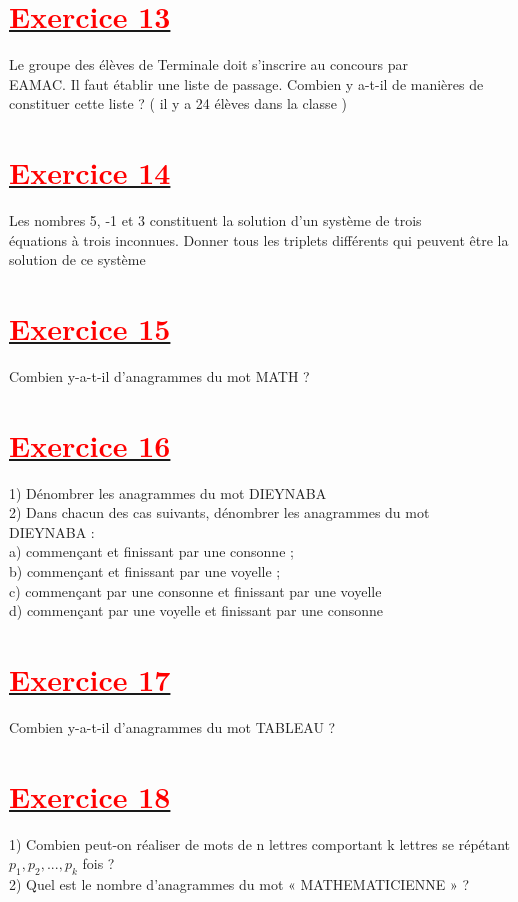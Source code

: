 \documentclass[12pt,a4paper]{article}
\begin{document}
\section*{\underline{\textbf{\textcolor{red}{Exercice 13}}}}
Le groupe des élèves de Terminale doit s'inscrire au concours par\\ EAMAC. Il faut établir une liste de passage. Combien y a-t-il de manières de constituer cette liste ? ( il y a 24 élèves dans la classe )
\section*{\underline{\textbf{\textcolor{red}{Exercice 14}}}}
Les nombres 5, -1 et 3 constituent la solution d’un système de trois\\ équations à trois inconnues. Donner tous les triplets différents qui peuvent être la solution de ce système
\section*{\underline{\textbf{\textcolor{red}{Exercice 15}}}}
Combien y-a-t-il d’anagrammes du mot MATH ?\\
\section*{\underline{\textbf{\textcolor{red}{Exercice 16}}}}
1) Dénombrer les anagrammes du mot DIEYNABA\\
2) Dans chacun des cas suivants, dénombrer les anagrammes du mot \\DIEYNABA :\\
a) commençant et finissant par une consonne ;\\
b) commençant et finissant par une voyelle ;\\
c) commençant par une consonne et finissant par une voyelle\\
d) commençant par une voyelle et finissant par une consonne\\
\section*{\underline{\textbf{\textcolor{red}{Exercice 17}}}}
Combien y-a-t-il d’anagrammes du mot TABLEAU ?
\section*{\underline{\textbf{\textcolor{red}{Exercice 18}}}}
1) Combien peut-on réaliser de mots de n lettres comportant k lettres se répétant $p_{1} ,p_{2},...,p_{k}$ fois ?\\
2) Quel est le nombre d’anagrammes du mot « MATHEMATICIENNE » ?
\end{document}
